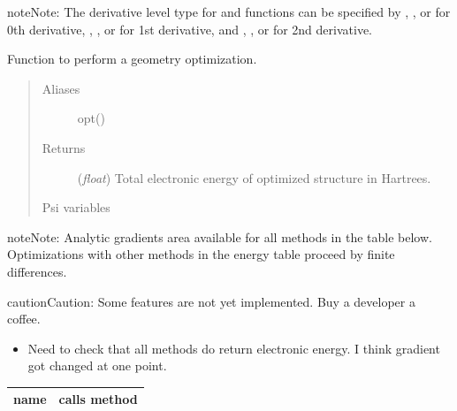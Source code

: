 \documentclass[letterpaper,10pt,english]{sphinxmanual}
\begin{document}
\begin{notice}{note}{Note:}
The derivative level type for {\hyperref[opt:driver.optimize]{}} and {\hyperref[opt:driver.frequency]{}}
functions can be specified by , , or  for 0th derivative,
, , or  for 1st derivative, and ,
, or  for 2nd derivative.
\end{notice}

\begin{fulllineitems}
\label{opt:driver.optimize}
Function to perform a geometry optimization.
\begin{quote}\begin{description}
\item[{Aliases }] \leavevmode
opt()

\item[{Returns}] \leavevmode
(\emph{float}) Total electronic energy of optimized structure in Hartrees.

\item[{Psi variables}] \leavevmode
\end{description}\end{quote}

\begin{fulllineitems}
\label{opt:envvar-CURRENTENERGY}
\end{fulllineitems}


\begin{notice}{note}{Note:}
Analytic gradients area available for all methods in the table
below. Optimizations with other methods in the energy table proceed
by finite differences.
\end{notice}

\begin{notice}{caution}{Caution:}
Some features are not yet implemented. Buy a developer a coffee.
\begin{itemize}
\item {} 
Need to check that all methods do return electronic energy. I think gradient got changed at one point.

\end{itemize}
\end{notice}

\begin{tabulary}{\linewidth}{|L|L|}
\hline
\textbf{
name
} & \textbf{
calls method
}\\\hline


\end{tabulary}
\end{fulllineitems}
\end{document}
